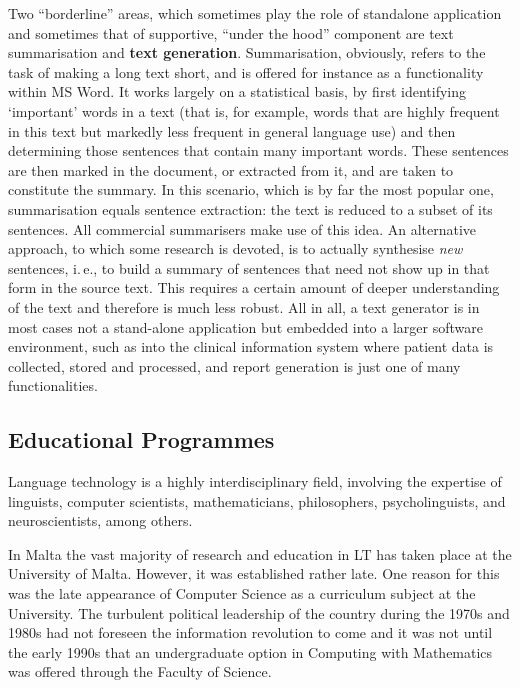 \documentclass[]{../../metanetpaper}
\begin{document}
\begin{multicols}{2}
Two ``borderline'' areas, which sometimes play the role of standalone application and sometimes that of supportive, ``under the hood'' component are text summarisation and \textbf{text generation}. Summarisation, obviously, refers to the task of making a long text short, and is offered for instance as a functionality within MS Word. It works largely on a statistical basis, by first identifying `important' words in a text (that is, for example, words that are highly frequent in this text but markedly less frequent in general language use) and then determining those sentences that contain many important words. These sentences are then marked in the document, or extracted from it, and are taken to constitute the summary. In this scenario, which is by far the most popular one, summarisation equals sentence extraction: the text is reduced to a subset of its sentences. All commercial summarisers make use of this idea. An alternative approach, to which some research is devoted, is to actually synthesise \emph{new} sentences, i.\,e., to build a summary of sentences that need not show up in that form in the source text. This requires a certain amount of deeper understanding of the text and therefore is much less robust. All in all, a text generator is in most cases not a stand-alone application but embedded into a larger software environment, such as into the clinical information system where patient data is collected, stored and processed, and report generation is just one of many functionalities.

\subsection{Educational Programmes}

Language technology is a highly interdisciplinary field, involving the expertise of linguists, computer scientists, mathematicians, philosophers, psycholinguists, and neuroscientists, among others. 

In Malta the vast majority of research and education in LT has taken place at the University of Malta. However, it was established rather late. One reason for this was the late appearance of Computer Science as a curriculum subject at the University. The turbulent political leadership of the country during the 1970s and 1980s had not foreseen the information revolution to come and it was not until the early 1990s that an undergraduate option in Computing with Mathematics was offered through the Faculty of Science. 


\end{multicols}
\end{document}
